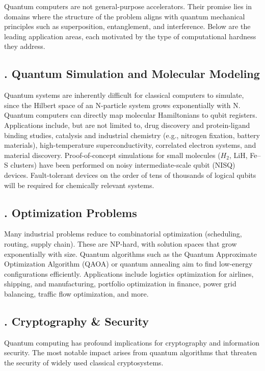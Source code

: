 \documentclass{elbioimp2}
\begin{document}
Quantum computers are not general-purpose accelerators. Their promise lies in domains where the structure of the problem aligns with quantum mechanical principles such as superposition, entanglement, and interference. Below are the leading application areas, each motivated by the type of computational hardness they address.

\subsection{. Quantum Simulation and Molecular Modeling}

Quantum systems are inherently difficult for classical computers to simulate, since the Hilbert space of an N-particle system grows exponentially with N. Quantum computers can directly map molecular Hamiltonians to qubit registers. Applications include, but are not limited to, drug discovery and protein-ligand binding studies, catalysis and industrial chemistry (e.g., nitrogen fixation, battery materials), high-temperature superconductivity, correlated electron systems, and material discovery. Proof-of-concept simulations for small molecules ($H_2$, LiH, Fe–S clusters) have been performed on noisy intermediate-scale qubit (NISQ) devices. Fault-tolerant devices on the order of tens of thousands of logical qubits will be required for chemically relevant systems.

\subsection{. Optimization Problems}

Many industrial problems reduce to combinatorial optimization (scheduling, routing, supply chain). These are NP-hard, with solution spaces that grow exponentially with size. Quantum algorithms such as the Quantum Approximate Optimization Algorithm (QAOA) or quantum annealing aim to find low-energy configurations efficiently. Applications include logistics optimization for airlines, shipping, and manufacturing, portfolio optimization in finance, power grid balancing, traffic flow optimization, and more.

\subsection{. Cryptography \& Security}

Quantum computing has profound implications for cryptography and information security. The most notable impact arises from quantum algorithms that threaten the security of widely used classical cryptosystems.
\end{document}
